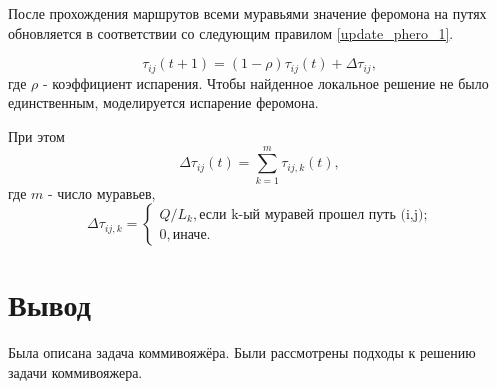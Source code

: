 После прохождения маршрутов всеми муравьями значение феромона на путях обновляется в соответствии со следующим правилом \eqref{update_phero_1}.

\begin{equation}
	\label{update_phero_1}
	\tau_{ij}(t+1) = (1-\rho) \tau_{ij}(t) + \Delta \tau_{ij},
\end{equation}
где $\rho$ - коэффициент испарения.
Чтобы найденное локальное решение не было единственным, моделируется испарение феромона.

При этом
\begin{equation}
	\label{update_phero_2}
	\Delta \tau_{ij}(t) = \sum_{k=1}^m \tau_{ij, k}(t),
\end{equation}
где $m$ - число муравьев,
\begin{equation}
	\label{update_phero_3}
	\Delta\tau_{ij,k} = \begin{cases}
		Q/L_{k}, \textrm{если k-ый муравей прошел путь (i,j);} \\
		0,\textrm{иначе.}
	\end{cases}
\end{equation}

\section*{Вывод}

Была описана задача коммивояжёра. Были рассмотрены подходы к решению задачи коммивояжера.